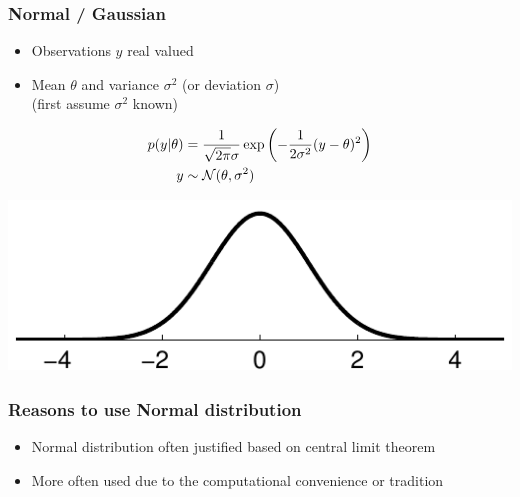 \documentclass[10pt,handout]{beamer}
\begin{document}
\begin{frame}
  \frametitle{Normal / Gaussian}

  \begin{itemize}
  \item Observations $y$ real valued
  \item Mean $\theta$ and variance $\sigma^2$ (or deviation $\sigma$)\\
    (first assume $\sigma^2$ known)
  \end{itemize}
  \vskip -2mm
  \begin{align*}
    p(y|\theta)&=\frac{1}{\sqrt{2\pi}\sigma}\exp\left(-\frac{1}{2\sigma^2}(y-\theta)^2\right)\\
    y & \sim \mathcal{N}(\theta,\sigma^2)
  \end{align*}

  \begin{center}
      \includegraphics[clip]{figs/kuva2b_1}
  \end{center}
\end{frame}

\begin{frame}

  \frametitle{Reasons to use Normal distribution}

  \begin{itemize}
  \item Normal distribution often justified based on central limit theorem
  \item More often used due to the computational convenience or tradition
  \end{itemize}

\end{frame}

\end{document}
